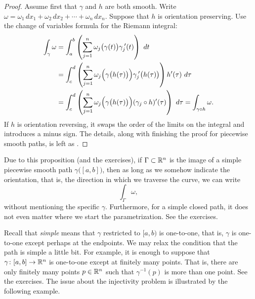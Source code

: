 \begin{proof}
Assume first that $\gamma$ and $h$ are both smooth.
Write $\omega = \omega_1 \, dx_1 + \omega_2 \, dx_2 + \cdots +
\omega_n \, dx_n$.
Suppose that $h$ is orientation preserving.  Use
the change of variables formula for the Riemann integral:
\begin{equation*}
\begin{split}
\int_{\gamma} \omega
& =
\int_a^b 
\left(
\sum_{j=1}^n
\omega_j\bigl(\gamma(t)\bigr) \gamma_j^{\:\prime}(t)
\right) ~ dt
\\
& =
\int_c^d 
\left(
\sum_{j=1}^n
\omega_j\Bigl(\gamma\bigl(h(\tau)\bigr)\Bigr) \gamma_j^{\:\prime}\bigl(h(\tau)\bigr)
\right) h'(\tau) ~ d\tau
\\
& =
\int_c^d 
\left(
\sum_{j=1}^n
\omega_j\Bigl(\gamma\bigl(h(\tau)\bigr)\Bigr) (\gamma_j \circ h)'(\tau)
\right) ~ d\tau
=
\int_{\gamma \circ h} \omega .
\end{split}
\end{equation*}
If $h$ is orientation reversing, it swaps the order of the limits on the
integral and introduces a minus sign.
The details, along with finishing the proof for piecewise smooth
paths, is left as .
\end{proof}

Due to this proposition (and the exercises), if $\Gamma
\subset {\mathbb{R}}^n$ is the image of a simple piecewise smooth path
$\gamma\bigl([a,b]\bigr)$, then as long as we somehow indicate the orientation, that
is, the direction in which we traverse the curve, we can write
\begin{equation*}
\int_{\Gamma} \omega ,
\end{equation*}
without mentioning the specific $\gamma$.
Furthermore, for a simple closed path, it does not even matter where we
start the parametrization.  See the exercises.

Recall that \emph{simple} means that $\gamma$ restricted to $[a,b)$ is
one-to-one, that is, $\gamma$ is one-to-one except perhaps at the endpoints.
We may relax the condition that the path is simple a little bit.
For example, it is enough to suppose that
$\gamma \colon [a,b] \to {\mathbb{R}}^n$ is one-to-one except at finitely many points.  That
is, there are only finitely many points $p \in {\mathbb{R}}^n$ such that
$\gamma^{-1}(p)$ is more than one point.  See the exercises.  The issue about the
injectivity
problem is illustrated by the following example.

